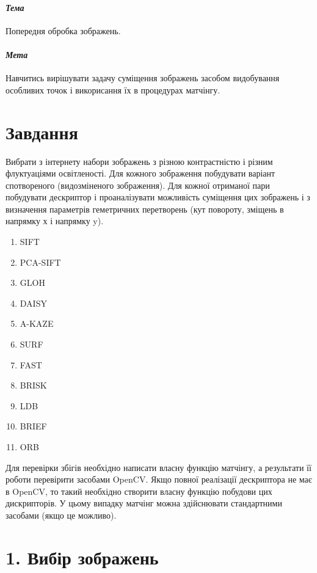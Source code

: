 \documentclass{/home/alx/Documents/LaTex/nulp}
\begin{document}

\paragraph*{\textit{Тема}} Попередня обробка зображень.

\paragraph*{\textit{Мета}} Навчитись вирішувати задачу суміщення зображень засобом видобування особливих точок і викорисання їх в процедурах матчінгу.

\justify

\section*{Завдання}
Вибрати з інтернету набори зображень з різною контрастністю і різним флуктуаціями освітленості. Для кожного зображення побудувати варіант спотвореного (видозміненого зображення). Для кожної отриманої пари побудувати дескриптор і проаналізувати можливість суміщення цих зображень і з визначення параметрів геметричних перетворень (кут повороту, зміщень в напрямку х і напрямку y).

\begin{enumerate}
\item SIFT
\item PCA-SIFT
\item GLOH
\item DAISY
\item A-KAZE
\item SURF
\item FAST
\item BRISK
\item LDB
\item BRIEF
\item ORB
\end{enumerate}

Для перевірки збігів необхідно написати власну функцію матчінгу, а результати її роботи перевірити засобами OpenCV. Якщо повної реалізації дескриптора не має в OpenCV, то такий необхідно створити власну функцію побудови цих дискрипторів. У цьому випадку матчінг можна здійснювати стандартними засобами (якщо це можливо).


\newpage

\section*{1. Вибір зображень}
\end{document}
